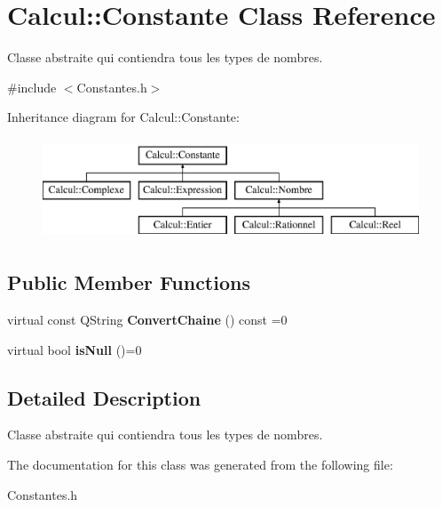 \hypertarget{class_calcul_1_1_constante}{\section{Calcul\-:\-:Constante Class Reference}
\label{class_calcul_1_1_constante}
}


Classe abstraite qui contiendra tous les types de nombres.  




{\ttfamily \#include $<$Constantes.\-h$>$}

Inheritance diagram for Calcul\-:\-:Constante\-:\begin{figure}[H]
\begin{center}
\leavevmode
\includegraphics[height=3.000000cm]{class_calcul_1_1_constante}
\end{center}
\end{figure}
\subsection*{Public Member Functions}
\begin{DoxyCompactItemize}
\item 
\hypertarget{class_calcul_1_1_constante_a80fb461841b16e6d5d1339802b69858e}{virtual const Q\-String {\bfseries Convert\-Chaine} () const =0}\label{class_calcul_1_1_constante_a80fb461841b16e6d5d1339802b69858e}

\item 
\hypertarget{class_calcul_1_1_constante_a1e7ed8f7bd512111af953d77175d9e19}{virtual bool {\bfseries is\-Null} ()=0}\label{class_calcul_1_1_constante_a1e7ed8f7bd512111af953d77175d9e19}

\end{DoxyCompactItemize}


\subsection{Detailed Description}
Classe abstraite qui contiendra tous les types de nombres. 

The documentation for this class was generated from the following file\-:\begin{DoxyCompactItemize}
\item 
Constantes.\-h\end{DoxyCompactItemize}
